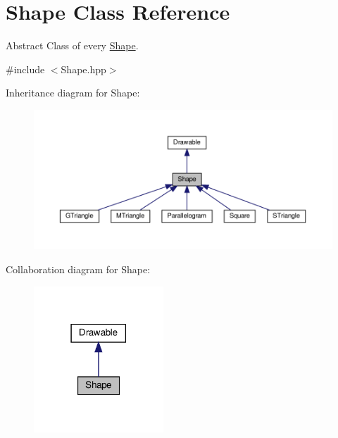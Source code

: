 \hypertarget{classShape}{}\section{Shape Class Reference}
\label{classShape}


Abstract Class of every \hyperlink{classShape}{Shape}.  




{\ttfamily \#include $<$Shape.\+hpp$>$}



Inheritance diagram for Shape\+:
\nopagebreak
\begin{figure}[H]
\begin{center}
\leavevmode
\includegraphics[width=350pt]{classShape__inherit__graph}
\end{center}
\end{figure}


Collaboration diagram for Shape\+:
\nopagebreak
\begin{figure}[H]
\begin{center}
\leavevmode
\includegraphics[width=138pt]{classShape__coll__graph}
\end{center}
\end{figure}
